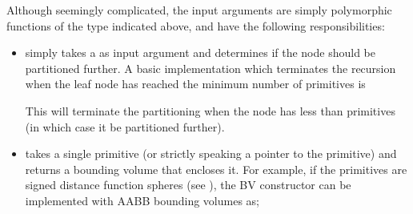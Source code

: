 \documentclass[letterpaper,10pt,english]{sphinxmanual}
\begin{document}
\sphinxAtStartPar
Although seemingly complicated, the input arguments are simply polymorphic functions of the type indicated above, and have the following responsibilities:
\begin{itemize}
\item {} 
\sphinxAtStartPar
{} simply takes a  as input argument and determines if the node should be partitioned further.
A basic implementation which terminates the recursion when the leaf node has reached the minimum number of primitives is

\begin{sphinxVerbatim}[commandchars=\\\{\}]
\PYG{p}{[}\PYG{p}{]}
\end{sphinxVerbatim}

\sphinxAtStartPar
This will terminate the partitioning when the node has less than  primitives (in which case it  be partitioned further).

\item {} 
\sphinxAtStartPar
{} takes a single primitive (or strictly speaking a pointer to the primitive) and returns a bounding volume that encloses it.
For example, if the primitives  are signed distance function spheres (see {\hyperref[\detokenize{ImplemSDF:chap-analyticsdf}]{}}), the BV constructor can be implemented
with AABB bounding volumes as;


\end{itemize}
\end{document}
